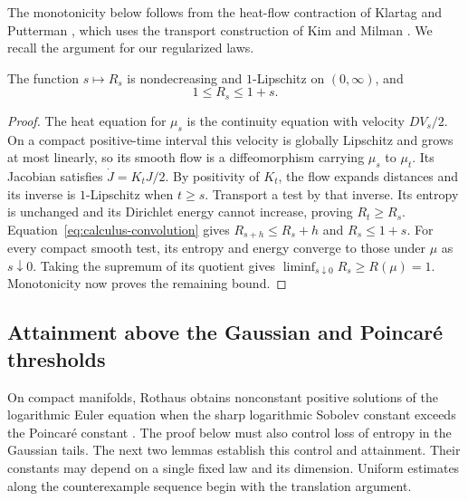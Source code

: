 The monotonicity below follows from the heat-flow contraction of
Klartag and Putterman \cite[Theorem~1.2 and Section~3]{KlartagPutterman2023},
which uses the transport construction of Kim and Milman
\cite{KimMilman2012}. We recall the argument for our regularized laws.

\begin{lemma}
\label{lem:critical-flow-bounds}
The function $s\mapsto R_s$ is nondecreasing and $1$-Lipschitz on
$(0,\infty)$, and
\begin{equation}\label{eq:critical-basic-R}
 1\le R_s\le1+s.
\end{equation}
\end{lemma}

\begin{proof}
The heat equation for $\mu_s$ is the continuity equation with
velocity $DV_s/2$. On a compact positive-time interval this velocity
is globally Lipschitz and grows at most linearly, so its smooth flow
is a diffeomorphism carrying $\mu_s$ to $\mu_t$. Its Jacobian
satisfies $\dot J=K_tJ/2$. By positivity of $K_t$, the flow
expands distances and its inverse is $1$-Lipschitz when $t\ge s$.
Transport a test by that inverse. Its entropy is unchanged and
its Dirichlet energy cannot increase, proving $R_t\ge R_s$.
Equation~\eqref{eq:calculus-convolution} gives
$R_{s+h}\le R_s+h$ and $R_s\le1+s$. For every compact smooth
test, its entropy and energy converge to those under $\mu$ as
$s\downarrow0$. Taking the supremum of its quotient gives
$\liminf_{s\downarrow0}R_s\ge R(\mu)=1$. Monotonicity now
proves the remaining bound.
\end{proof}

\subsection{Attainment above the Gaussian and Poincar\'e thresholds}

On compact manifolds, Rothaus obtains nonconstant positive solutions
of the logarithmic Euler equation when the sharp logarithmic Sobolev
constant exceeds the Poincar\'e constant \cite[p.~358]{Rothaus1986}.
The proof below must also control loss of entropy in the Gaussian tails.
The next two lemmas establish this control and attainment. Their constants
may depend on a single fixed law and its dimension. Uniform estimates
along the counterexample sequence begin with the translation argument.

